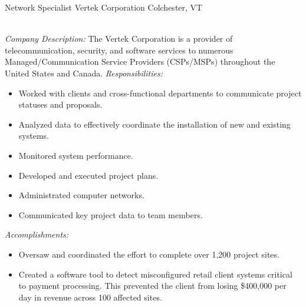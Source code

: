 \begin{samepage}
	{Network Specialist}
	{Vertek Corporation}
	{Colchester, VT}{}
	{
		\emph{\\Company Description:}
		The Vertek Corporation is a provider of telecommunication, security,
		and software services to numerous Managed/Communication Service
		Providers (CSPs/MSPs) throughout the United States and Canada.
		\newline{}
		\newline{}
		\emph{Responsibilities:}
		\begin{itemize}
			\item Worked with clients and cross-functional departments to communicate project statuses and proposals.
			\item Analyzed data to effectively coordinate the installation of new and existing systems.
			\item Monitored system performance.
			\item Developed and executed project plans.
			\item Administrated computer networks.
			\item Communicated key project data to team members.\\
		\end{itemize}
		\emph{Accomplishments:}
		\begin{itemize}
			\item Oversaw and coordinated the effort to complete over 1,200 project sites.
			\item Created a software tool to detect misconfigured retail client systems critical to payment processing.
			      This prevented the client from losing \$400,000 per day in revenue across 100 affected sites.\\
		\end{itemize}
	}
\end{samepage}

